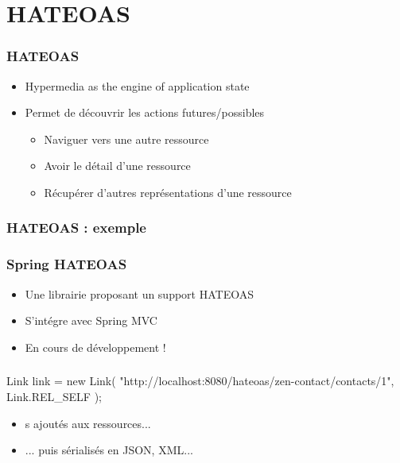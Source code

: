 \section{HATEOAS}


\begin{frame}
 \frametitle{HATEOAS}
 \begin{itemize}
  \item Hypermedia as the engine of application state
  \item Permet de découvrir les actions futures/possibles
  \begin{itemize}
   \item Naviguer vers une autre ressource
   \item Avoir le détail d'une ressource
   \item Récupérer d'autres représentations d'une ressource
  \end{itemize}
 \end{itemize}
\end{frame}

\begin{frame}[fragile]
 \frametitle{HATEOAS : exemple}
 \begin{textcode}
 \end{textcode}

\end{frame}

\begin{frame}
 \frametitle{Spring HATEOAS}
 \begin{itemize}
  \item Une librairie proposant un support HATEOAS
  \item S'intégre avec Spring MVC
  \item En cours de développement !
 \end{itemize}

\end{frame}

\begin{frame}[fragile]
 \frametitle{}
 
 \begin{javacode}
Link link = new Link(
  "http://localhost:8080/hateoas/zen-contact/contacts/1",
  Link.REL_SELF
);
 \end{javacode}

 \begin{itemize}
  \item {}s ajoutés aux ressources...
  \item ... puis sérialisés en JSON, XML...
 \end{itemize}

\end{frame}

